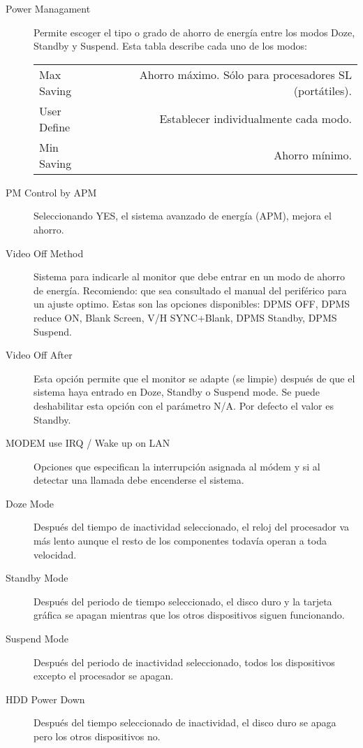 \documentclass[12pt,oneside,a4paper]{article}
\begin{document}
			\begin{description}
				\item[Power Managament] Permite escoger el tipo o grado de
					ahorro de energía entre los modos Doze, Standby y Suspend.
					Esta tabla describe cada uno de los modos:

					\begin{tabular}{| l | r |}
						\hline
		 Max Saving  & Ahorro máximo. Sólo para procesadores SL (portátiles). \\ 
		 User Define & Establecer individualmente cada modo. \\ 
		 Min Saving  & Ahorro mínimo. \\ 
						\hline
					\end{tabular}
				\item[PM Control by APM] Seleccionando YES, el sistema avanzado
					de energía (APM), mejora el ahorro.
				\item[Video Off Method] Sistema para indicarle al monitor que
					debe entrar en un modo de ahorro de energía. Recomiendo:
					que sea consultado el manual del periférico para un ajuste
					optimo.  Estas son las opciones disponibles: DPMS OFF, DPMS
					reduce ON, Blank Screen, V/H SYNC+Blank, DPMS Standby, DPMS
					Suspend.
				\item[Video Off After] Esta opción permite que el monitor se
					adapte (se limpie) después de que el sistema haya entrado
					en Doze, Standby o Suspend mode. Se puede deshabilitar esta
					opción con el parámetro N/A. Por defecto el valor es
					Standby.
				\item[MODEM use IRQ / Wake up on LAN] Opciones que especifican
					la interrupción asignada al módem y si al detectar una
					llamada debe encenderse el sistema.
				\item[Doze Mode] Después del tiempo de inactividad
					seleccionado, el reloj del procesador va más lento aunque
					el resto de los componentes todavía operan a toda
					velocidad.
				\item[Standby Mode] Después del periodo de tiempo seleccionado,
					el disco duro y la tarjeta gráfica se apagan mientras que
					los otros dispositivos siguen funcionando.
				\item[Suspend Mode] Después del periodo de inactividad
					seleccionado, todos los dispositivos excepto el procesador
					se apagan.
				\item[HDD Power Down] Después del tiempo seleccionado de
					inactividad, el disco duro se apaga pero los otros
					dispositivos no.

\end{description}
\end{document}
